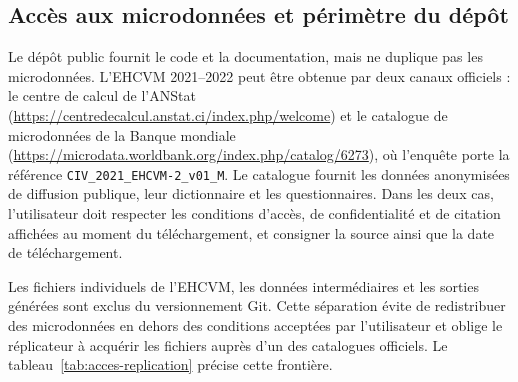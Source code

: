 \documentclass[11pt,a4paper]{article}
\begin{document}
\subsection{Accès aux microdonnées et périmètre du dépôt}

Le dépôt public fournit le code et la documentation, mais ne duplique pas les
microdonnées. L'EHCVM 2021--2022 peut être obtenue par deux canaux officiels :
le centre de calcul de l'ANStat
(\url{https://centredecalcul.anstat.ci/index.php/welcome}) et le catalogue de
microdonnées de la Banque mondiale
(\url{https://microdata.worldbank.org/index.php/catalog/6273}), où l'enquête
porte la référence \texttt{CIV\_2021\_EHCVM-2\_v01\_M}. Le catalogue fournit
les données anonymisées de diffusion publique, leur dictionnaire et les
questionnaires. Dans les deux cas, l'utilisateur doit respecter les conditions
d'accès, de confidentialité et de citation affichées au moment du
téléchargement, et consigner la source ainsi que la date de téléchargement.

Les fichiers individuels de l'EHCVM, les données intermédiaires et les sorties
générées sont exclus du versionnement Git. Cette séparation évite de
redistribuer des microdonnées en dehors des conditions acceptées par
l'utilisateur et oblige le réplicateur à acquérir les fichiers auprès d'un des
catalogues officiels. Le tableau~\ref{tab:acces-replication} précise cette
frontière.
\end{document}
